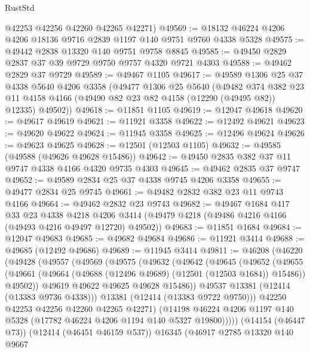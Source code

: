 \begin{lexlean}{RustStd}
\begin{coremodule}
{\begin{coremodule}
{{{{{{{{{{{{{{{{{{{{{{{{{{{{{{{{{{{{{{{{{{{{{{{{{{      @42253
      @42256
      @42260
      @42265
      @42271)
@49569 := @18132 @46224 @4206 @4206 @18136 @9716 @2839 @1197 @140 @9751 @9760 @4338 @5328
@49575 := @49442 @2838 @13320 @140 @9751 @9758 @8845
@49585 := @49450 @2829 @2837 @37 @39 @9729 @9750 @9757 @4320 @9721 @4303
@49588 := @49462 @2829 @37 @9729
@49589 := @49467 @1105
@49617 := @49589
    @1306
    @25
    @37
    @4338
    @5640
    @4206
    @3358
    (@49477
      @1306
      @25
      @5640
      (@49482
        @374
        @382
        @23
        @11
        @4158
        @4166
        (@49490 @82 @23 @82 @4158 (@12290 (@49495 @82)) @12335)
        @49502))
@49618 := @11851 @1105
@49619 := @12047 @49618
@49620 := @49617 @49619
@49621 := @11921 @3358
@49622 := @12492 @49621
@49623 := @49620 @49622
@49624 := @11945 @3358
@49625 := @12496 @49624
@49626 := @49623 @49625
@49628 := @12501 (@12503 @1105)
@49632 := @49585 (@49588 (@49626 @49628 @15486))
@49642 := @49450 @2835 @382 @37 @11 @9747 @4338 @4166 @4320 @9735 @4303
@49645 := @49462 @2835 @37 @9747
@49652 := @49589 @2834 @25 @37 @4338 @9745 @4206 @3358
@49655 := @49477 @2834 @25 @9745
@49661 := @49482 @2832 @382 @23 @11 @9743 @4166
@49664 := @49462 @2832 @23 @9743
@49682 := @49467
    @1684
    @417
    @33
    @23
    @4338
    @4218
    @4206
    @3414
    (@49479 @4218 (@49486 @4216 @4166 (@49493 @4216 @49497 @12720) @49502))
@49683 := @11851 @1684
@49684 := @12047 @49683
@49685 := @49682 @49684
@49686 := @11921 @3414
@49688 := @49685 (@12492 @49686)
@49689 := @11945 @3414
@49811 := @46208
    (@46220
      (@49428
        (@49557
          (@49569
            (@49575
              (@49632
                (@49642
                  (@49645
                    (@49652
                      (@49655
                        (@49661
                          (@49664 (@49688 (@12496 @49689) (@12501 (@12503 @1684)) @15486))
                          @49502))
                      @49619
                      @49622
                      @49625
                      @49628
                      @15486))
                  @49537
                  @13381
                  (@12414 (@13383 @9736 @4338)))
                @13381
                (@12414 (@13383 @9722 @9750)))
              @42250
              @42253
              @42256
              @42260
              @42265
              @42271)
            (@14198 @46224 @4206 @1197 @140 @5328 (@17782 @46224 @4206 @1194 @140 @5327 @19800)))))
      (@14154 (@46447 @73))
      (@12414 (@46451 @46159 @537))
      @16345
      (@46917
        @2785
        @13320
        @140
        @9667
}}}}}}}}}}}}}}}}}}}}}}}}}}}}}}}}}}}}}}}}}}}}}}}}}}
\end{coremodule}}
\end{coremodule}
\end{lexlean}
